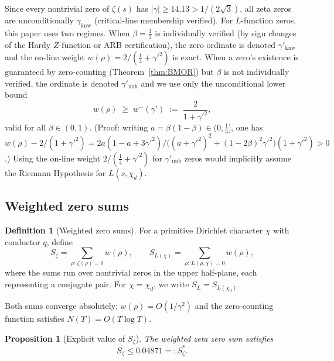 \documentclass[12pt,reqno]{amsart}
\theoremstyle{plain}
\newtheorem{proposition}[theorem]{Proposition}
\theoremstyle{definition}
\newtheorem{definition}[theorem]{Definition}
\theoremstyle{remark}
\newcommand{\half}{\tfrac{1}{2}}
\newcommand{\quarter}{\tfrac{1}{4}}
\begin{document}
Since every nontrivial zero of $\zeta(s)$ has $|\gamma| \geq 14.13 > 1/(2\sqrt{3})$, all zeta zeros are unconditionally $\gamma_{\mathrm{knw}}$ (critical-line membership verified).  For $L$-function zeros, this paper uses two regimes.  When $\beta = \half$ is individually verified (by sign changes of the Hardy $Z$-function or ARB certification), the zero ordinate is denoted $\gamma'_{\mathrm{knw}}$ and the on-line weight $w(\rho) = 2/(\quarter + \gamma'^2)$ is exact.  When a zero's existence is guaranteed by zero-counting (Theorem~\ref{thm:BMOR}) but $\beta$ is not individually verified, the ordinate is denoted $\gamma'_{\mathrm{unk}}$ and we use only the unconditional lower bound
\begin{equation}\label{eq:weight-lower}
w(\rho) \;\geq\; w^-(\gamma') \;:=\; \frac{2}{1 + \gamma'^2},
\end{equation}
valid for all $\beta \in (0,1)$.  (Proof: writing $a = \beta(1-\beta) \in (0, \tfrac{1}{4}]$, one has $w(\rho) - 2/(1+\gamma'^2) = 2a(1 - a + 3\gamma'^2)/\bigl((a+\gamma'^2)^2 + (1-2\beta)^2\gamma'^2\bigr)(1+\gamma'^2) > 0$.)  Using the on-line weight $2/(\quarter + \gamma'^2)$ for $\gamma'_{\mathrm{unk}}$ zeros would implicitly assume the Riemann Hypothesis for $L(s,\chi_d)$.

\subsection{Weighted zero sums}

\begin{definition}[Weighted zero sums]\label{def:S-sums}
For a primitive Dirichlet character $\chi$ with conductor $q$, define
\[
S_\zeta = \sum_{\rho:\,\zeta(\rho)=0} w(\rho), \qquad
S_{L(\chi)} = \sum_{\rho:\,L(\rho,\chi)=0} w(\rho),
\]
where the sums run over nontrivial zeros in the upper half-plane, each representing a conjugate pair. For $\chi = \chi_d$, we write $S_L = S_{L(\chi_d)}$.
\end{definition}

Both sums converge absolutely: $w(\rho) = O(1/\gamma^2)$ and the zero-counting function satisfies $N(T) = O(T\log T)$.

\begin{proposition}[Explicit value of $S_\zeta$]\label{prop:S-zeta-value}
The weighted zeta zero sum satisfies
\begin{equation}\label{eq:S-zeta-bound}
S_\zeta \leq 0.04871 =: S_\zeta^*.
\end{equation}
\end{proposition}
\end{document}
